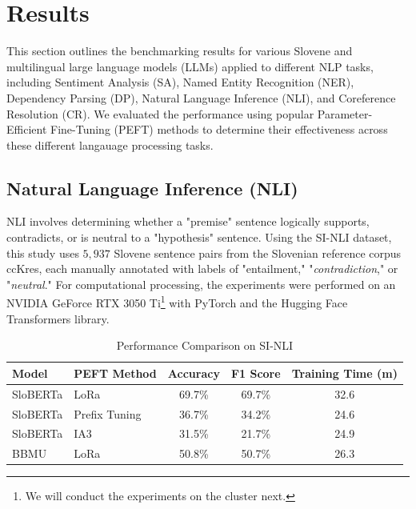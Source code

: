\documentclass[fleqn,moreauthors,10pt]{ds_report}
\begin{document}
\section{Results}
This section outlines the benchmarking results for various Slovene and multilingual large language models (LLMs) applied to different NLP tasks, including Sentiment Analysis (SA), Named Entity Recognition (NER), Dependency Parsing (DP), Natural Language Inference (NLI), and Coreference Resolution (CR). We evaluated the performance using popular Parameter-Efficient Fine-Tuning (PEFT) methods to determine their effectiveness across these different langauage processing tasks.

\subsection{Natural Language Inference (NLI)}
NLI involves determining whether a "premise" sentence logically supports, contradicts, or is neutral to a "hypothesis" sentence. Using the SI-NLI dataset, this study uses $5,937$ Slovene sentence pairs from the Slovenian reference corpus ccKres, each manually annotated with labels of "entailment," "\textit{contradiction}," or "\textit{neutral}."
For computational processing, the experiments were performed on an NVIDIA GeForce RTX 3050 Ti\footnote{We will conduct the experiments on the cluster next.} with PyTorch and the Hugging Face Transformers library.

\begin{table}[ht]
\centering
\caption{Performance Comparison on SI-NLI}
\label{tab:nli_results}
\small
\begin{tabular}{@{}llccc@{}}
\toprule
Model & PEFT Method & Accuracy & F1 Score & Training Time (m)\\ \midrule
SloBERTa & LoRa & 69.7\% & 69.7\% & 32.6 \\
SloBERTa & Prefix Tuning & 36.7\% & 34.2\% & 24.6 \\
SloBERTa & IA3 & 31.5\% & 21.7\% & 24.9 \\
BBMU & LoRa & 50.8\% & 50.7\% & 26.3 \\
\bottomrule
\end{tabular}
\end{table}
\end{document}

